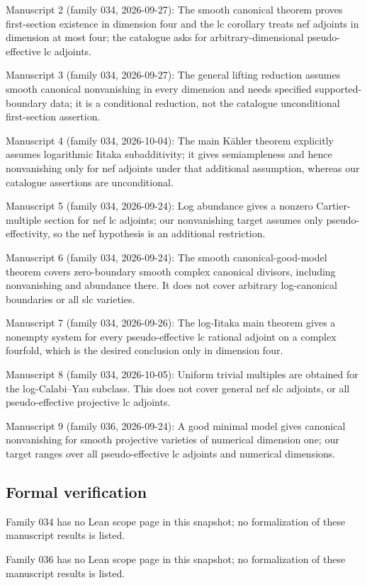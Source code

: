 \documentclass[11pt]{article}
\begin{document}
Manuscript 2 (family 034, 2026-09-27): The smooth canonical theorem proves first-section existence in dimension four and the lc corollary treats nef adjoints in dimension at most four; the catalogue asks for arbitrary-dimensional pseudo-effective lc adjoints.

Manuscript 3 (family 034, 2026-09-27): The general lifting reduction assumes smooth canonical nonvanishing in every dimension and needs specified supported-boundary data; it is a conditional reduction, not the catalogue unconditional first-section assertion.

Manuscript 4 (family 034, 2026-10-04): The main Kähler theorem explicitly assumes logarithmic Iitaka subadditivity; it gives semiampleness and hence nonvanishing only for nef adjoints under that additional assumption, whereas our catalogue assertions are unconditional.

Manuscript 5 (family 034, 2026-09-24): Log abundance gives a nonzero Cartier-multiple section for nef lc adjoints; our nonvanishing target assumes only pseudo-effectivity, so the nef hypothesis is an additional restriction.

Manuscript 6 (family 034, 2026-09-24): The smooth canonical-good-model theorem covers zero-boundary smooth complex canonical divisors, including nonvanishing and abundance there. It does not cover arbitrary log-canonical boundaries or all slc varieties.

Manuscript 7 (family 034, 2026-09-26): The log-Iitaka main theorem gives a nonempty system for every pseudo-effective lc rational adjoint on a complex fourfold, which is the desired conclusion only in dimension four.

Manuscript 8 (family 034, 2026-10-05): Uniform trivial multiples are obtained for the log-Calabi–Yau subclass. This does not cover general nef slc adjoints, or all pseudo-effective projective lc adjoints.

Manuscript 9 (family 036, 2026-09-24): A good minimal model gives canonical nonvanishing for smooth projective varieties of numerical dimension one; our target ranges over all pseudo-effective lc adjoints and numerical dimensions.

\subsection{Formal verification}
Family 034 has no Lean scope page in this snapshot; no formalization of these manuscript results is listed.

Family 036 has no Lean scope page in this snapshot; no formalization of these manuscript results is listed.
\end{document}
